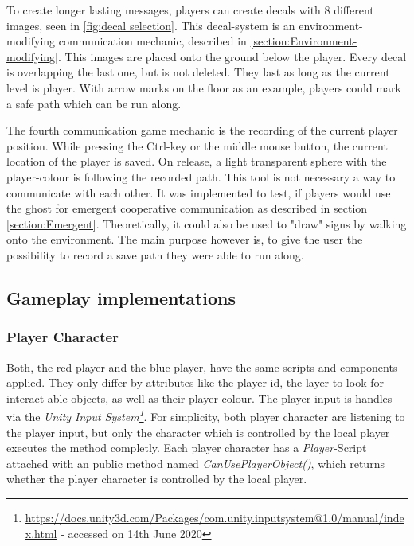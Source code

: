 To create longer lasting messages, players can create decals with 8 different images, seen in \ref{fig:decal selection}. This decal-system is an environment-modifying communication mechanic, described in \ref{section:Environment-modifying}. This images are placed onto the ground below the player. Every decal is overlapping the last one, but is not deleted. They last as long as the current level is player. With arrow marks on the floor as an example, players could mark a safe path which can be run along.


The fourth communication game mechanic is the recording of the current player position. While pressing the Ctrl-key or the middle mouse button, the current location of the player is saved. On release, a light transparent sphere with the player-colour is following the recorded path. This tool is not necessary a way to communicate with each other. It was implemented to test, if players would use the ghost for emergent cooperative communication as described in section \ref{section:Emergent}. Theoretically, it could also be used to "draw" signs by walking onto the environment. The main purpose however is, to give the user the possibility to record a save path they were able to run along.



\subsection{Gameplay implementations}
\label{section:Gameplay implementations}


\subsubsection{Player Character}

Both, the red player and the blue player, have the same scripts and components applied. They only differ by attributes like the player id, the layer to look for interact-able objects, as well as their player colour.
The player input is handles via the \textit{Unity Input System\footnote{\url{https://docs.unity3d.com/Packages/com.unity.inputsystem@1.0/manual/index.html} - accessed on 14th June 2020}}. For simplicity, both player character are listening to the player input, but only the character which is controlled by the local player executes the method completly.
Each player character has a \textit{Player}-Script attached with an public method named \textit{CanUsePlayerObject()}, which returns whether the player character is controlled by the local player.

